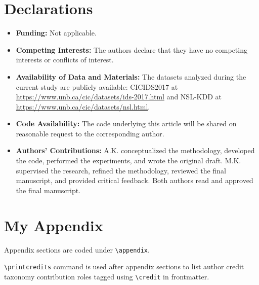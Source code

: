 \documentclass[a4paper,fleqn]{cas-sc}
\begin{document}
\section*{Declarations}
\begin{itemize}
\item \textbf{Funding:} Not applicable.
\item \textbf{Competing Interests:} The authors declare that they have no competing interests or conflicts of interest.
\item \textbf{Availability of Data and Materials:} The datasets analyzed during the current study are publicly available: CICIDS2017 at \url{https://www.unb.ca/cic/datasets/ids-2017.html} and NSL-KDD at \url{https://www.unb.ca/cic/datasets/nsl.html}.
\item \textbf{Code Availability:} The code underlying this article will be shared on reasonable request to the corresponding author.
\item \textbf{Authors' Contributions:} A.K. conceptualized the methodology, developed the code, performed the experiments, and wrote the original draft. M.K. supervised the research, refined the methodology, reviewed the final manuscript, and provided critical feedback. Both authors read and approved the final manuscript.
\end{itemize}


\appendix
\section{My Appendix}
Appendix sections are coded under \verb+\appendix+.

\verb+\printcredits+ command is used after appendix sections to list 
author credit taxonomy contribution roles tagged using \verb+\credit+ 
in frontmatter.

\printcredits

%



\end{document}
